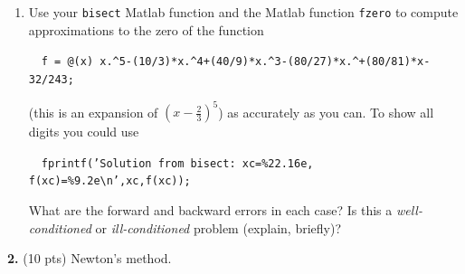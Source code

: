 \documentclass[10pt,letterpaper]{article}
\begin{document}
\begin{enumerate}
\begin{enumerate}[1. ]
\color{TangGreen}
\begin{gather*}
\text{FE} = |x_{e} - x_{a}| = |0.6 - 0.61| = 0.01 \\
\text{BE} = |f(x_{a})| = |(5 * 0.61 - 3)^{7}| = \num{7.8125e-10} \\
\text{EMF} = \frac{\text{FE}}{\text{BE}} = \frac{0.01}{\num{7.8125e-10}} = \num{1.28e7}
\end{gather*}
\color{black}

\item $f(x) = (5x - 3)^{1/3}$

\color{TangGreen}
\begin{gather*}
\text{FE} = |x_{e} - x_{a}| = |0.6 - 0.61| = 0.01 \\
\text{BE} = |f(x_{a})| = |(0.5 * 0.61 - 3)^{1/3}| = 0.368 \\
\text{EMF} = \frac{\text{FE}}{\text{BE}} = \frac{0.01}{0.368} = 0.0272
\end{gather*}
\color{black}

\end{enumerate}

\item Use your {\tt bisect} Matlab function and the Matlab function {\tt fzero} to compute approximations to the zero of the function

\ \ {\tt f = @(x) x.\textasciicircum5-(10/3)*x.\textasciicircum4+(40/9)*x.\textasciicircum3-(80/27)*x.\textasciicircum+(80/81)*x-32/243;}

(this is an expansion of $(x - \frac{2}{3})^{5}$) as accurately as you can. To show all digits you could use

\ \ {\tt fprintf('Solution from bisect: xc=\%22.16e, f(xc)=\%9.2e\textbackslash n’,xc,f(xc));}

What are the forward and backward errors in each case? Is this a \textit{well-conditioned} or \textit{ill-conditioned} problem (explain, briefly)?

\color{TangGreen}

\color{black}

\end{enumerate}

\noindent\textbf{2.} (10 pts) Newton's method. 
\end{document}
